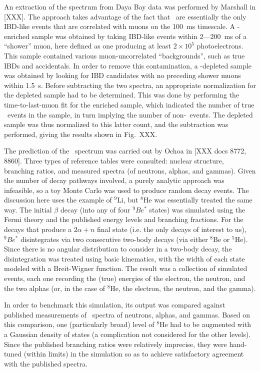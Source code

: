 \documentclass[../thesis.tex]{subfiles}
\begin{document}
An extraction of the spectrum from Daya Bay data was performed by Marshall in [XXX]. The approach takes advantage of the fact that \LiHe\ are essentially the only IBD-like events that are correlated with muons on the 100~ms timescale. A \LiHe-enriched sample was obtained by taking IBD-like events within 2---200~ms of a ``shower'' muon, here defined as one producing at least $2\times10^5$ photoelectrons. This sample contained various muon-uncorrelated ``backgrounds'', such as true IBDs and accidentals. In order to remove this contamination, a \LiHe-depleted sample was obtained by looking for IBD candidates with no preceding shower muons within 1.5~s. Before subtracting the two spectra, an appropriate normalization for the depleted sample had to be determined. This was done by performing the time-to-last-muon fit for the enriched sample, which indicated the number of true \LiHe\ events in the sample, in turn implying the number of non-\LiHe\ events. The depleted sample was thus normalized to this latter count, and the subtraction was performed, giving the results shown in Fig.~XXX.

The prediction of the \LiHe\ spectrum was carried out by Ochoa in [XXX docs 8772, 8860]. Three types of reference tables were consulted: nuclear structure, branching ratios, and measured spectra (of neutrons, alphas, and gammas). Given the number of decay pathways involved, a purely analytic approach was infeasible, so a toy Monte Carlo was used to produce random decay events. The discussion here uses the example of $^9$Li, but $^8$He was essentially treated the same way. The initial $\beta$ decay (into any of four $^9Be^*$ states) was simulated using the Fermi theory and the published energy levels and branching fractions. For the decays that produce a $2\alpha+n$ final state (i.e. the only decays of interest to us), $^9Be^*$ disintegrates via two consecutive two-body decays (via either $^8$Be or $^5$He). Since there is no angular distribution to consider in a two-body decay, the disintegration was treated using basic kinematics, with the width of each state modeled with a Breit-Wigner function. The result was a collection of simulated events, each one recording the (true) energies of the electron, the neutron, and the two alphas (or, in the case of $^8$He, the electron, the neutron, and the gamma).

In order to benchmark this simulation, its output was compared against published measurements of \LiHe\ spectra of neutrons, alphas, and gammas. Based on this comparison, one (particularly broad) level of $^8$He had to be augmented with a Gaussian density of states (a complication not considered for the other levels). Since the published branching ratios were relatively imprecise, they were hand-tuned (within limits) in the simulation so as to achieve satisfactory agreement with the published spectra.
\end{document}
